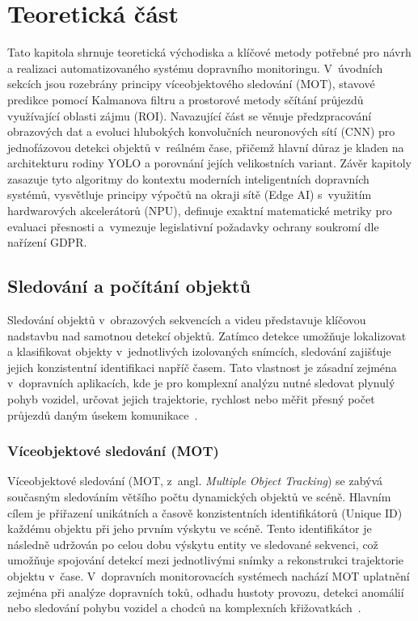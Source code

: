 \chapter{Teoretická část}
Tato kapitola shrnuje teoretická východiska a klíčové metody potřebné pro návrh a realizaci automatizovaného systému dopravního monitoringu. V~úvodních sekcích jsou rozebrány principy víceobjektového sledování (\acs{MOT}), stavové predikce pomocí Kalmanova filtru a prostorové metody sčítání průjezdů využívající oblasti zájmu (\acs{ROI}). Navazující část se věnuje předzpracování obrazových dat a evoluci hlubokých konvolučních neuronových sítí (\acs{CNN}) pro jednofázovou detekci objektů v~reálném čase, přičemž hlavní důraz je kladen na architekturu rodiny \acs{YOLO} a porovnání jejích velikostních variant. Závěr kapitoly zasazuje tyto algoritmy do kontextu moderních inteligentních dopravních systémů, vysvětluje principy výpočtů na okraji sítě (\acs{Edge AI}) s~využitím hardwarových akcelerátorů (\acs{NPU}), definuje exaktní matematické metriky pro evaluaci přesnosti a~vymezuje legislativní požadavky ochrany soukromí dle nařízení \acs{GDPR}.

\section{Sledování a počítání objektů}
Sledování objektů v~obrazových sekvencích a videu představuje klíčovou nadstavbu nad samotnou detekcí objektů. Zatímco detekce umožňuje lokalizovat a klasifikovat objekty v~jednotlivých izolovaných snímcích, sledování zajišťuje jejich konzistentní identifikaci napříč časem. Tato vlastnost je zásadní zejména v~dopravních aplikacích, kde je pro komplexní analýzu nutné sledovat plynulý pohyb vozidel, určovat jejich trajektorie, rychlost nebo měřit přesný počet průjezdů daným úsekem komunikace~\cite{szeliski_computer_vision, zhou_traffic_survey_2024}.

\subsection{Víceobjektové sledování (MOT)}
Víceobjektové sledování (MOT, z~angl. \textit{Multiple Object Tracking}) se zabývá současným sledováním většího počtu dynamických objektů ve scéně. Hlavním cílem je přiřazení unikátních a časově konzistentních identifikátorů (Unique \acs{ID}) každému objektu při jeho prvním výskytu ve scéně. Tento identifikátor je následně udržován po celou dobu výskytu entity ve sledované sekvenci, což umožňuje spojování detekcí mezi jednotlivými snímky a rekonstrukci trajektorie objektu v~čase. V~dopravních monitorovacích systémech nachází MOT uplatnění zejména při analýze dopravních toků, odhadu hustoty provozu, detekci anomálií nebo sledování pohybu vozidel a chodců na komplexních křižovatkách~\cite{zhou_traffic_survey_2024}.

